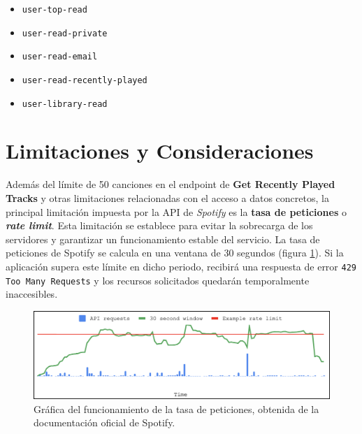 \setlength{\columnsep}{-1em} %
\begin{multicols}{2} %
    \begin{itemize}
        \setlength{\itemsep}{0.3em} %
        \setlength{\topsep}{0.5em}  %
        \setlength{\parsep}{0pt}    %
        \setlength{\parskip}{0pt}   %
        \item \texttt{user-top-read}
        \item \texttt{user-read-private}
        \item \texttt{user-read-email}
        \item \texttt{user-read-recently-played}
        \item \texttt{user-library-read}
    \end{itemize}
\end{multicols}

\section{Limitaciones y Consideraciones}

Además del límite de 50 canciones en el endpoint de \textbf{Get Recently Played Tracks} y otras limitaciones relacionadas con el acceso a datos concretos, la principal limitación impuesta por la API de \textit{Spotify} es la \textbf{tasa de peticiones} o  \textit{\textbf{rate limit}}. Esta limitación se establece para evitar la sobrecarga de los servidores y garantizar un funcionamiento estable del servicio. La tasa de peticiones de Spotify se calcula en una ventana de 30 segundos (figura \ref{fig:rate_limit}). Si la aplicación supera este límite en dicho periodo, recibirá una respuesta de error \texttt{429 Too Many Requests} y los recursos solicitados quedarán temporalmente inaccesibles.

\begin{figure}[H]
    \centering
    \includegraphics[width=\textwidth]{figures/rate_limit.png}
    \caption{Gráfica del funcionamiento de la tasa de peticiones, obtenida de la documentación oficial de Spotify.}
    \label{fig:rate_limit}
\end{figure}

